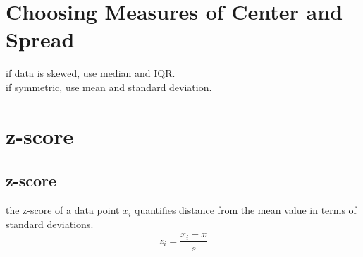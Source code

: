 \section{Choosing Measures of Center and Spread}
if data is skewed, use median and IQR.\\
if symmetric, use mean and standard deviation.

\section{z-score}
\subsection{z-score}
the z-score of a data point $x_i$ quantifies distance from the mean value in terms of standard deviations.
\begin{equation}z_i=\frac{x_i-\bar{x}}{s}\end{equation}
